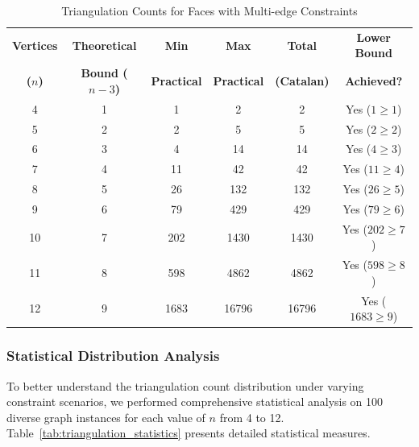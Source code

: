 \documentclass[12pt,a4paper]{article}
\theoremstyle{definition}
\theoremstyle{remark}
\begin{document}
\begin{table}[H]
\centering
\caption{Triangulation Counts for Faces with Multi-edge Constraints}
\label{tab:triangulation_counts}
\small
\begin{tabular}{|c|c|c|c|c|c|}
\hline
\textbf{Vertices} & \textbf{Theoretical} & \textbf{Min} & \textbf{Max} & \textbf{Total} & \textbf{Lower Bound} \\
\textbf{($n$)} & \textbf{Bound ($n-3$)} & \textbf{Practical} & \textbf{Practical} & \textbf{(Catalan)} & \textbf{Achieved?} \\
\hline
4 & 1 & 1 & 2 & 2 & Yes ($1 \geq 1$) \\
\hline
5 & 2 & 2 & 5 & 5 & Yes ($2 \geq 2$) \\
\hline
6 & 3 & 4 & 14 & 14 & Yes ($4 \geq 3$) \\
\hline
7 & 4 & 11 & 42 & 42 & Yes ($11 \geq 4$) \\
\hline
8 & 5 & 26 & 132 & 132 & Yes ($26 \geq 5$) \\
\hline
9 & 6 & 79 & 429 & 429 & Yes ($79 \geq 6$) \\
\hline
10 & 7 & 202 & 1430 & 1430 & Yes ($202 \geq 7$) \\
\hline
11 & 8 & 598 & 4862 & 4862 & Yes ($598 \geq 8$) \\
\hline
12 & 9 & 1683 & 16796 & 16796 & Yes ($1683 \geq 9$) \\
\hline
\end{tabular}
\end{table}

\subsubsection{Statistical Distribution Analysis}

To better understand the triangulation count distribution under varying constraint scenarios, we performed comprehensive statistical analysis on 100 diverse graph instances for each value of $n$ from 4 to 12. Table~\ref{tab:triangulation_statistics} presents detailed statistical measures.
\end{document}
